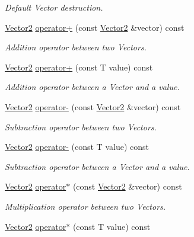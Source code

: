 \begin{DoxyCompactItemize}
\begin{DoxyCompactList}\small\item\em Default Vector destruction. \end{DoxyCompactList}\item 
\hyperlink{classsparky_1_1_vector2}{Vector2} \hyperlink{classsparky_1_1_vector2_a9bbccccae4177bf66b92361467499483}{operator+} (const \hyperlink{classsparky_1_1_vector2}{Vector2} \&vector) const 
\begin{DoxyCompactList}\small\item\em Addition operator between two Vectors. \end{DoxyCompactList}\item 
\hyperlink{classsparky_1_1_vector2}{Vector2} \hyperlink{classsparky_1_1_vector2_adeba5a6db0e22c6c5a7b2c8c4ad32997}{operator+} (const T value) const 
\begin{DoxyCompactList}\small\item\em Addition operator between a Vector and a value. \end{DoxyCompactList}\item 
\hyperlink{classsparky_1_1_vector2}{Vector2} \hyperlink{classsparky_1_1_vector2_adf06d5cdd7f79a3ba3add3ec99c54a8d}{operator-\/} (const \hyperlink{classsparky_1_1_vector2}{Vector2} \&vector) const 
\begin{DoxyCompactList}\small\item\em Subtraction operator between two Vectors. \end{DoxyCompactList}\item 
\hyperlink{classsparky_1_1_vector2}{Vector2} \hyperlink{classsparky_1_1_vector2_a7c9eb262606abaafe7c1aeff4d940e82}{operator-\/} (const T value) const 
\begin{DoxyCompactList}\small\item\em Subtraction operator between a Vector and a value. \end{DoxyCompactList}\item 
\hyperlink{classsparky_1_1_vector2}{Vector2} \hyperlink{classsparky_1_1_vector2_aeab66fc5fe4f5084064d0daf46916c1b}{operator$\ast$} (const \hyperlink{classsparky_1_1_vector2}{Vector2} \&vector) const 
\begin{DoxyCompactList}\small\item\em Multiplication operator between two Vectors. \end{DoxyCompactList}\item 
\hyperlink{classsparky_1_1_vector2}{Vector2} \hyperlink{classsparky_1_1_vector2_ab32ed07efc65a6a4bb8faae76e49870c}{operator$\ast$} (const T value) const 

\end{DoxyCompactItemize}
